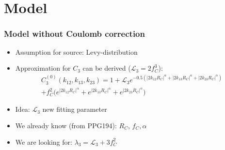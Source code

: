 \documentclass{beamer}
\begin{document}
\section{Model}
\begin{frame}
\frametitle{Model without Coulomb correction}
\begin{itemize}
\setlength{\itemsep}{16pt}
\item Assumption for source: Levy-distribution
\item Approximation for $C_3$ can be derived ($\mathcal{L}_3=2f_C^3$):
\begin{align}
C_3^{(0)}(k_{12}, k_{13}, k_{23}) = 1+ \mathcal{L}_3e^{-0.5(|2k_{12}R_C|^\alpha+|2k_{13}R_C|^\alpha+|2k_{23}R_C|^\alpha)}\nonumber\\
+f_C^2\bigg(e^{|2k_{12}R_C|^\alpha}+e^{|2k_{13}R_C|^\alpha}+e^{|2k_{23}R_C|^\alpha}\bigg)
\end{align}
\item Idea: $\mathcal{L}_3$ new fitting parameter
\item We already know (from PPG194): $R_C$, $f_C, \alpha$
\item We are looking for: $\lambda_3=\mathcal{L}_3+3f_C^2$
\end{itemize}
\end{frame}
\end{document}
